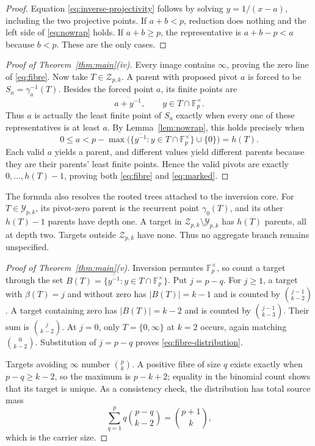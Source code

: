 \documentclass[a4paper,10pt]{amsart}
\theoremstyle{remark}
\newcommand{\F}{\mathbb F}
\newcommand{\Y}{\mathcal Y}
\newcommand{\Z}{\mathcal Z}
\begin{document}
\begin{proof}
Equation \eqref{eq:inverse-projectivity} follows by solving
$y=1/(x-a)$, including the two projective points.  If $a+b<p$, reduction
does nothing and the left side of \eqref{eq:nowrap} holds.  If $a+b\geq p$,
the representative is $a+b-p<a$ because $b<p$.  These are the only cases.
\end{proof}

\begin{proof}[Proof of Theorem~\ref{thm:main}(iv)]
Every image contains $\infty$, proving the zero line of \eqref{eq:fibre}.
Now take $T\in\Z_{p,k}$.  A parent with proposed pivot $a$ is forced to be
$S_a=\gamma_a^{-1}(T)$.  Besides the forced point $a$, its finite points are
\[
 \overline{a+y^{-1}},\qquad y\in T\cap\F_p^\times.
\]
Thus $a$ is actually the least finite point of $S_a$ exactly when every one
of these representatives is at least $a$.  By Lemma~\ref{lem:nowrap}, this
holds precisely when
\[
 0\leq a<p-\max\bigl(\{\overline{y^{-1}}:
                   y\in T\cap\F_p^\times\}\cup\{0\}\bigr)=h(T).
\]
Each valid $a$ yields a parent, and different values yield different parents
because they are their parents' least finite points.  Hence the valid pivots
are exactly $0,\ldots,h(T)-1$, proving both \eqref{eq:fibre} and
\eqref{eq:marked}.
\end{proof}

The formula also resolves the rooted trees attached to the inversion core.
For $T\in\Y_{p,k}$, its pivot-zero parent is the recurrent point
$\gamma_0(T)$, and its other $h(T)-1$ parents have depth one.  A target in
$\Z_{p,k}\setminus\Y_{p,k}$ has $h(T)$ parents, all at depth two.  Targets
outside $\Z_{p,k}$ have none.  Thus no aggregate branch remains unspecified.

\begin{proof}[Proof of Theorem~\ref{thm:main}(v)]
Inversion permutes $\F_p^\times$, so count a target through the set
$B(T)=\{\overline{y^{-1}}:y\in T\cap\F_p^\times\}$.  Put $j=p-q$.
For $j\geq1$, a target with $\beta(T)=j$ and without zero has $|B(T)|=k-1$
and is counted by $\binom{j-1}{k-2}$.  A target containing zero has
$|B(T)|=k-2$ and is counted by $\binom{j-1}{k-3}$.  Their sum is
$\binom{j}{k-2}$.  At $j=0$, only $T=\{0,\infty\}$ at $k=2$ occurs, again
matching $\binom{0}{k-2}$.  Substitution of $j=p-q$ proves
\eqref{eq:fibre-distribution}.

Targets avoiding $\infty$ number $\binom pk$.  A positive fibre of size
$q$ exists exactly when $p-q\geq k-2$, so the maximum is $p-k+2$; equality
in the binomial count shows that its target is unique.  As a consistency
check, the distribution has total source mass
\[
 \sum_{q=1}^{p}q\binom{p-q}{k-2}=\binom{p+1}{k},
\]
which is the carrier size.
\end{proof}
\end{document}
